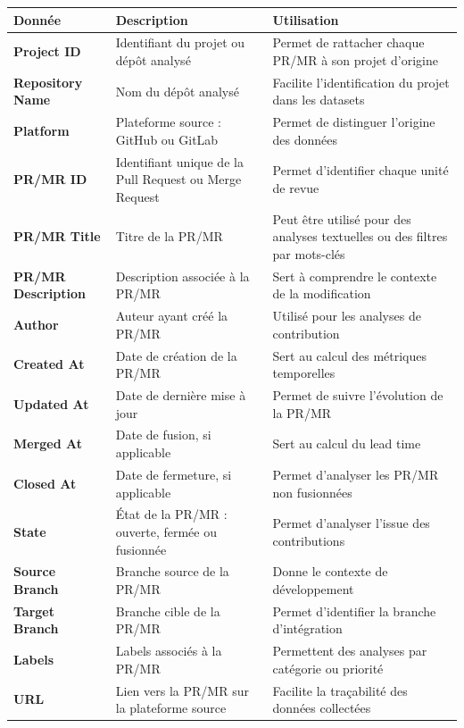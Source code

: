 \begin{table}[H]
\centering
\begin{tabular}{|p{3.5cm}|p{5cm}|p{6cm}|}
\hline
\textbf{Donnée} & \textbf{Description} & \textbf{Utilisation} \\
\hline
\textbf{Project ID} & Identifiant du projet ou dépôt analysé & Permet de rattacher chaque PR/MR à son projet d’origine \\
\hline
\textbf{Repository Name} & Nom du dépôt analysé & Facilite l’identification du projet dans les datasets \\
\hline
\textbf{Platform} & Plateforme source : GitHub ou GitLab & Permet de distinguer l’origine des données \\
\hline
\textbf{PR/MR ID} & Identifiant unique de la Pull Request ou Merge Request & Permet d’identifier chaque unité de revue \\
\hline
\textbf{PR/MR Title} & Titre de la PR/MR & Peut être utilisé pour des analyses textuelles ou des filtres par mots-clés \\
\hline
\textbf{PR/MR Description} & Description associée à la PR/MR & Sert à comprendre le contexte de la modification \\
\hline
\textbf{Author} & Auteur ayant créé la PR/MR & Utilisé pour les analyses de contribution \\
\hline
\textbf{Created At} & Date de création de la PR/MR & Sert au calcul des métriques temporelles \\
\hline
\textbf{Updated At} & Date de dernière mise à jour & Permet de suivre l’évolution de la PR/MR \\
\hline
\textbf{Merged At} & Date de fusion, si applicable & Sert au calcul du lead time \\
\hline
\textbf{Closed At} & Date de fermeture, si applicable & Permet d’analyser les PR/MR non fusionnées \\
\hline
\textbf{State} & État de la PR/MR : ouverte, fermée ou fusionnée & Permet d’analyser l’issue des contributions \\
\hline
\textbf{Source Branch} & Branche source de la PR/MR & Donne le contexte de développement \\
\hline
\textbf{Target Branch} & Branche cible de la PR/MR & Permet d’identifier la branche d’intégration \\
\hline
\textbf{Labels} & Labels associés à la PR/MR & Permettent des analyses par catégorie ou priorité \\
\hline
\textbf{URL} & Lien vers la PR/MR sur la plateforme source & Facilite la traçabilité des données collectées \\
\hline
\end{tabular}
\end{table}

